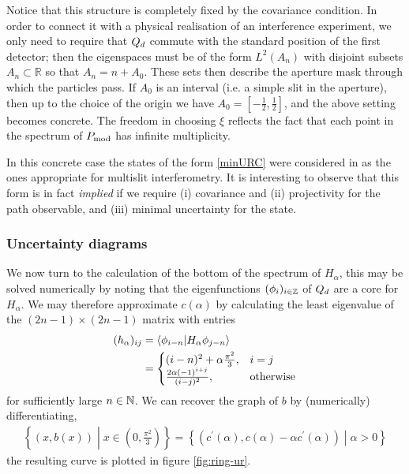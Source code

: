 Notice that this structure is completely fixed by the covariance condition. In order to connect it with a physical realisation of an interference experiment, we only need to require that $Q_d$ commute with the standard position of the first detector; then the eigenspaces must be of the form $L^2(A_n)$ with disjoint subsets $A_n\subset \mathbb R$ so that $A_n = n+ A_0$. These sets then describe the aperture mask through which the particles pass. If $A_0$ is an interval (i.e. a simple slit in the aperture), then up to the choice of the origin we have $A_0=[-\frac 12,\frac 12]$, and the above setting becomes concrete. The freedom in choosing $\xi$ reflects the fact that each point in the spectrum of $P_{\mathrm{mod}}$ has infinite multiplicity. 

In this concrete case the states of the form \eqref{minURC} were considered in \cite{} as the ones appropriate for multislit interferometry. It is interesting to observe that this form is in fact \emph{implied} if we require (i) covariance and (ii) projectivity for the path observable, and (iii) minimal uncertainty for the state.

\subsubsection{Uncertainty diagrams}
We now turn to the calculation of the bottom of the spectrum of $H_\alpha$, this may be solved numerically by noting that the eigenfunctions $(\phi_i)_{i\in\mathbb{Z}}$ of $Q_d$ are a core for $H_\alpha$. We may therefore approximate $c(\alpha)$ by calculating the least eigenvalue of the $(2n-1)\times (2n-1)$ matrix with entries
\begin{align}
  (h_\alpha)_{ij} &= \langle \phi_{i-n}|H_\alpha \phi_{j-n}\rangle\\
                  &= \begin{cases}(i-n)^2 + \alpha\frac{\pi^2}{3},& i = j\\ \frac{2 \alpha(-1)^{i+j}}{(i-j)^2}, & \text{otherwise}\end{cases}
\end{align}
for sufficiently large $n\in\mathbb{N}$. We can recover the graph of $b$ by (numerically) differentiating, 
\begin{align}
  \left\{(x,b(x))\middle|x\in \left(0,\frac{\pi^2}{3}\right)\right\} = \left\{ (c^\prime(\alpha), c(\alpha)-\alpha c^\prime(\alpha))\middle| \alpha > 0\right\}
\end{align}
the resulting curve is plotted in figure \ref{fig:ring-ur}.

